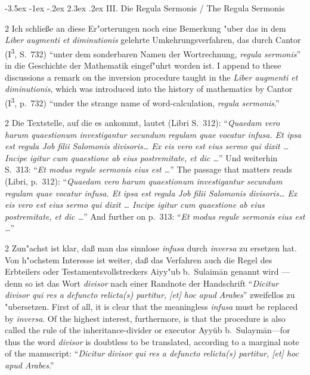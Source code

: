 \documentclass[10pt,a4paper]{article}
\makeatletter
\renewcommand{\switchcolumn}{\syncronize\nointerlineskip\columnbreak}
\renewcommand{\section}{\@startsection{section}{1}{\z@}%
  {-3.5ex \@plus -1ex \@minus -.2ex}%
  {2.3ex \@plus .2ex}%
  {\normalfont\Large\bfseries\color{sectioncolor}}}
\newcommand{\enquote}[1]{``#1''}
\makeatother
\begin{document}
\section{III. Die Regula Sermonis / The Regula Sermonis}

\begin{paracol}{2}
Ich schlie\ss{}e an diese Er"orterungen noch eine Bemerkung "uber das in dem \textit{Liber augmenti et diminutionis} gelehrte Umkehrungsverfahren, das durch Cantor (I\textsuperscript{3}, S.\ 732) \enquote{unter dem sonderbaren Namen der Wortrechnung, \textit{regula sermonis}} in die Geschichte der Mathematik eingef"uhrt worden ist.
\switchcolumn
I append to these discussions a remark on the inversion procedure taught in the \textit{Liber augmenti et diminutionis}, which was introduced into the history of mathematics by Cantor (I\textsuperscript{3}, p.\ 732) ``under the strange name of word-calculation, \textit{regula sermonis}.''
\end{paracol}

\begin{paracol}{2}
Die Textstelle, auf die es ankommt, lautet (Libri S.\ 312): \enquote{\textit{Quaedam vero harum quaestionum investigantur secundum regulam quae vocatur infusa. Et ipsa est regula Job filii Salomonis divisoris\ldots{} Ex eis vero est eius sermo qui dixit \ldots{} Incipe igitur cum quaestione ab eius postremitate, et dic \ldots{}}} Und weiterhin S.\ 313: \enquote{\textit{Et modus regule sermonis eius est \ldots{}}}
\switchcolumn
The passage that matters reads (Libri, p.\ 312): ``\textit{Quaedam vero harum quaestionum investigantur secundum regulam quae vocatur infusa. Et ipsa est regula Job filii Salomonis divisoris\ldots{} Ex eis vero est eius sermo qui dixit \ldots{} Incipe igitur cum quaestione ab eius postremitate, et dic \ldots{}}'' And further on p.\ 313: ``\textit{Et modus regule sermonis eius est \ldots{}}''
\end{paracol}

\begin{paracol}{2}
Zun"achst ist klar, da\ss{} man das sinnlose \textit{infusa} durch \textit{inversa} zu ersetzen hat. Von h"ochstem Interesse ist weiter, da\ss{} das Verfahren auch die Regel des Erbteilers oder Testamentsvollstreckers Aiyy"ub b.\ Sulaim\=an genannt wird --- denn so ist das Wort \textit{divisor} nach einer Randnote der Handschrift \enquote{\textit{Dicitur divisor qui res a defuncto relicta(s) partitur, [et] hoc apud Arabes}} zweifellos zu "ubersetzen.
\switchcolumn
First of all, it is clear that the meaningless \textit{infusa} must be replaced by \textit{inversa}. Of the highest interest, furthermore, is that the procedure is also called the rule of the inheritance-divider or executor Ayy\"ub b.\ Sulaym\=an---for thus the word \textit{divisor} is doubtless to be translated, according to a marginal note of the manuscript: ``\textit{Dicitur divisor qui res a defuncto relicta(s) partitur, [et] hoc apud Arabes}.''
\end{paracol}
\end{document}
